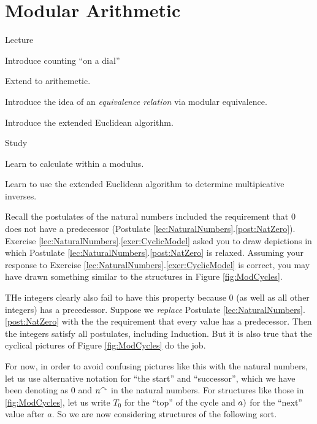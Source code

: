 \chapter{Modular Arithmetic}

\begin{goals}
	\begin{goal}{Lecture}
		\item Introduce counting ``on a dial''
		\item Extend to arithemetic.
		\item Introduce the idea of an \emph{equivalence relation} via modular equivalence.
		\item Introduce the extended Euclidean algorithm.
	\end{goal}
	
	\begin{goal}{Study}
		\item Learn to calculate within a modulus.
		\item Learn to use the extended Euclidean algorithm to determine multipicative inverses.
	\end{goal}
\end{goals}

Recall the postulates of the natural numbers included the requirement that $0$ does not have  a predecessor (Postulate \ref{lec:NaturalNumbers}.\ref{post:NatZero}).  Exercise \ref{lec:NaturalNumbers}.\ref{exer:CyclicModel} asked you to draw depictions in which Postulate \ref{lec:NaturalNumbers}.\ref{post:NatZero} is relaxed. 
Assuming your response to Exercise \ref{lec:NaturalNumbers}.\ref{exer:CyclicModel} is correct, you may have drawn something similar to the structures in Figure \ref{fig:ModCycles}.

THe integers clearly also fail to have this property because $0$ (as well as all other integers) has a precedessor. Suppose we \emph{replace} Postulate \ref{lec:NaturalNumbers}.\ref{post:NatZero} with the the requirement that every value has a predecessor. Then the integers satisfy all postulates, including Induction. But it is also true that the cyclical pictures of Figure \ref{fig:ModCycles} do the job. 

For now, in order to avoid confusing pictures like this with the natural numbers, let us use alternative notation for ``the start'' and ``successor'', which we have been denoting as $0$ and $n^\curvearrowright$ in the natural numbers.
For structures like those in \ref{fig:ModCycles}, let us write $T_0$ for the ``top'' of the cycle and $\next(a)$ for the ``next'' value after $a$. So we are now considering structures of the following sort.

